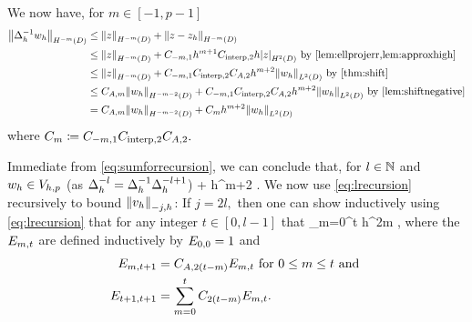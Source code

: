 We now have, for $m \in [-1,p-1]$
\begin{align}
\NHmmD{\DeltahI \wh} &\leq \NHmmD{z} + \NHmmD{z-\zh}\nonumber\\
&\leq \NHmmD{z} + \Cmmo h^{m+1} \Cinterpt h \SNHtD{z} \text{ by \cref{lem:ellprojerr,lem:approxhigh}}\nonumber\\
&\leq \NHmmD{z} + \Cmmo \Cinterpt \CAt h^{m+2} \NLtD{\wh} \text{ by \cref{thm:shift}}\nonumber\\
&\leq \CAm \NHmmmtD{\wh} + \Cmmo \Cinterpt \CAt h^{m+2} \NLtD{\wh} \text{ by \cref{lem:shiftnegative}}\nonumber\\
&= \CAm \NHmmmtD{\wh} + \Cm h^{m+2} \NLtD{\wh}\label{eq:sumforrecursion}
\end{align}
where $C_{m} \coloneqq C_{-m,1} C_{\mathrm{interp},2} C_{A,2}.$

Immediate from \cref{eq:sumforrecursion}, we can conclude that, for $l \in \mathbb N$ and $w_{h} \in V_{h,p}$ (as $\Delta_{h}^{-l} = \Delta_{h}^{-1} \Delta_{h}^{-l+1}$)
\beq\label{eq:lrecursion}
\NHmmD{\Deltahml \vh} \leq \CAm \NHmmmtD{\Deltahmlpo \vh} + \Cm h^{m+2} \NLtD{\Deltahmlpo \vh}.
\eeq
We now use \cref{eq:lrecursion} recursively to bound $\Nmjh{\vh}$:
If $j = 2l,$ then one can show inductively using \cref{eq:lrecursion} that for any integer $t \in [0,l-1]$ that
\beq\label{eq:evenrecursivesum}
 \leq \sum_{m=0}^t h^{2m}  ,
\eeq
where the $E_{m,t}$ are defined inductively by $E_{0,0}=1$ and
\begin{align*}
E_{m,t+1} &= C_{A,2(t-m)} E_{m,t} \text{ for } 0 \leq m \leq t \text{ and }\\
E_{t+1,t+1} &= \sum_{m=0}^t C_{2(t-m)} E_{m,t}.
\end{align*}

